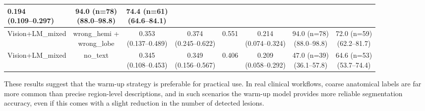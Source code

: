 \documentclass[FCD_GNN.tex]{subfiles}
\begin{document}
\begin{table}[H]
\begin{tabular}{lccccccc}
    \makecell{0.194 \\ (0.109--0.297)} &
    \makecell{94.0 (n=78) \\ (88.0--98.8)} &
    \makecell{\colorbox{green!15}{74.4 (n=61)} \\ (64.6--84.1)} \\
    \hline
    Vision+LM\_mixed &
    \makecell{wrong\_hemi + \\ wrong\_lobe} &
    \makecell{0.353 \\ (0.137--0.489)} &
    \makecell{0.374 \\ (0.245--0.622)} &
    \colorbox{cyan!15}{0.551} &
    \makecell{0.214 \\ (0.074--0.324)} &
    \makecell{94.0 (n=78) \\ (88.0--98.8)} &
    \makecell{\colorbox{orange!15}{72.0 (n=59)} \\ (62.2--81.7)} \\
    \hline
    Vision+LM\_mixed &
    no\_text &
    \makecell{0.345 \\ (0.108--0.453)} &
    \makecell{0.349 \\ (0.156--0.567)} &
    0.406 &
    \makecell{0.209 \\ (0.058--0.292)} &
    \makecell{47.0 (n=39) \\ (36.1--57.8)} &
    \makecell{64.6 (n=53) \\ (53.7--74.4)} \\
    \hline
    \end{tabular}
\end{table}

These results suggest that the warm-up strategy is preferable for practical use.
In real clinical workflows, coarse anatomical labels are far more common than
precise region-level descriptions, and in such scenarios the warm-up model provides
more reliable segmentation accuracy, even if this comes with a slight reduction in
the number of detected lesions.

\end{document}
